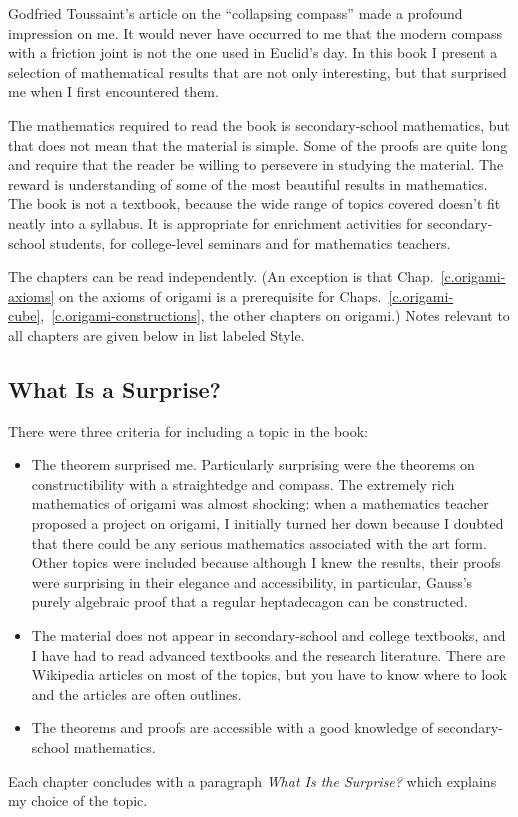 \preface

Godfried Toussaint's article on the ``collapsing compass''  \cite{toussaint} made a profound impression on me. It would never have occurred to me that the modern compass with a friction joint is not the one used in Euclid's day. In this book I present a selection of mathematical results that are not only interesting, but that surprised me when I first encountered them.

The mathematics required to read the book is secondary-school mathematics, but that does not mean that the material is simple. Some of the proofs are quite long and require that the reader be willing to persevere in studying the material. The reward is understanding of some of the most beautiful results in mathematics. The book is not a textbook, because the wide range of topics covered doesn't fit neatly into a syllabus. It is appropriate for enrichment activities for secondary-school students, for college-level seminars and for mathematics teachers.

 The chapters can be read independently. (An exception is that Chap.~\ref{c.origami-axioms} on the axioms of origami is a prerequisite for Chaps.~\ref{c.origami-cube},~\ref{c.origami-constructions}, the other chapters on origami.) Notes relevant to all chapters are given below in list labeled Style.

\subsection*{What Is a Surprise?}

There were three criteria for including a topic in the book:
\begin{itemize}
\item The theorem surprised me. Particularly surprising were the theorems on constructibility with a straightedge and compass. The extremely rich mathematics of origami was almost shocking: when a mathematics teacher proposed a project on origami, I initially turned her down because I doubted that there could be any serious mathematics associated with the art form.
Other topics were included because although I knew the results, their proofs were surprising in their elegance and accessibility, in particular, Gauss's purely algebraic proof that a regular heptadecagon can be constructed.

\item The material does not appear in secondary-school and college textbooks, and I have had to read advanced textbooks and the research literature. There are Wikipedia articles on most of the topics, but you have to know where to look and the articles are often outlines.

\item The theorems and proofs are accessible with a good knowledge of secondary-school mathematics.
\end{itemize}
Each chapter concludes with a paragraph \textit{What Is the Surprise?} which explains my choice of the topic.

